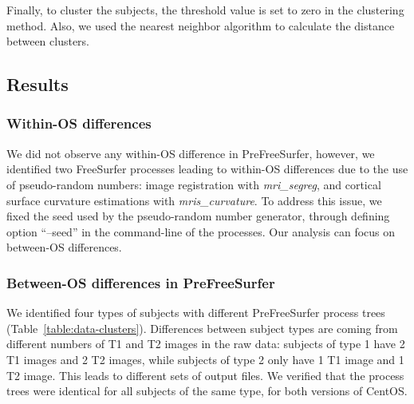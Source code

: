 \documentclass[a4paper,num-refs]{oup-contemporary}
\begin{document}
Finally, to cluster the subjects, the threshold value is set to zero in the clustering method. 
Also, we used the nearest neighbor algorithm to calculate the distance between clusters.


\subsection{Results}

\subsubsection{Within-OS differences}

We did not observe any within-OS difference in PreFreeSurfer, however, we
identified two FreeSurfer processes leading to within-OS differences due
to the use of pseudo-random numbers: image registration with
\emph{mri\_segreg}, and cortical surface curvature
estimations with \emph{mris\_curvature}. To address this issue, we fixed
the seed used by the pseudo-random number generator, through defining 
option ``--seed'' in the command-line of the processes.
Our analysis can focus on between-OS differences. 

\subsubsection{Between-OS differences in PreFreeSurfer}

We identified four types of subjects with different PreFreeSurfer process
trees (Table~\ref{table:data-clusters}). Differences between subject types
are coming from different  numbers of T1 and T2 images in the raw data:
subjects of type 1 have 2 T1 images and 2 T2 images, while subjects of type
2 only have 1 T1 image and 1 T2 image. This leads to
different sets of output files. We verified that the process trees were
identical for all subjects of the same type, for both versions of
CentOS.
\end{document}
